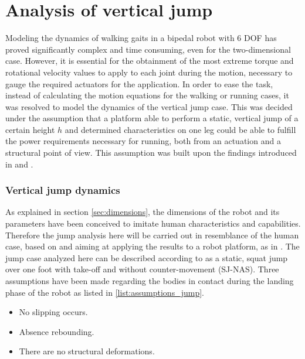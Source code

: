 
\section{Analysis of vertical jump} %
\label{sec:jumping_case}
Modeling the dynamics of walking gaits in a bipedal robot with 6 DOF has proved significantly complex and time consuming, even for the two-dimensional case.
However, it is essential for the obtainment of the most extreme torque and rotational velocity values to apply to each joint during the motion, necessary to gauge the required actuators for the application.
In order to ease the task, instead of calculating the motion equations for the walking or running cases, it was resolved to model the dynamics of the vertical jump case.
This was decided under the assumption that a platform able to perform a static, vertical jump of a certain height $h$ and determined characteristics on one leg could be able to fulfill the power requirements necessary for running, both from an actuation and a structural point of view.
This assumption was built upon the findings introduced in \cite{jump-run1} and \cite{jump-run2}.

\subsubsection{Vertical jump dynamics} %
\label{ssub:static_jumping_dynamics}
As explained in section \ref{sec:dimensions}, the dimensions of the robot and its parameters have been conceived to imitate human characteristics and capabilities.
Therefore the jump analysis here will be carried out in resemblance of the human case, based on \cite{jump-dynamics1} and aiming at applying the results to a robot platform, as in \cite{jump-dynamics2}.
The jump case analyzed here can be described according to \cite{jump-dynamics1} as a static, squat jump over one foot with take-off and without counter-movement (SJ-NAS).
Three assumptions have been made regarding the bodies in contact during the landing phase of the robot as listed in \ref{list:assumptions_jump}.

\begin{itemize}
\label{list:assumptions_jump}
    \item No slipping occurs.
    \item Absence rebounding.
    \item There are no structural deformations.
\end{itemize}

